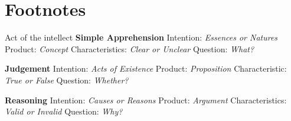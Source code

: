 \documentclass[xcolor=dvipsnames]{beamer}
\begin{document}
\section{Footnotes}


\begin{frame}{Act of the intellect}
\textbf{Simple Apprehension}\newline
Intention: \emph{Essences or Natures}\newline
Product: \emph{Concept}\newline
Characteristics: \emph{Clear or Unclear}\newline
Question: \emph{What?}\newline

\textbf{Judgement}\newline
Intention: \emph{Acts of Existence}\newline
Product: \emph{Proposition}\newline
Characteristic: \emph{True or False}\newline
Question: \emph{Whether?}\newline

\textbf{Reasoning}\newline
Intention: \emph{Causes or Reasons}\newline
Product: \emph{Argument}\newline
Characteristics: \emph{Valid or Invalid}\newline
Question: \emph{Why?}\newline
\end{frame}
\end{document}
